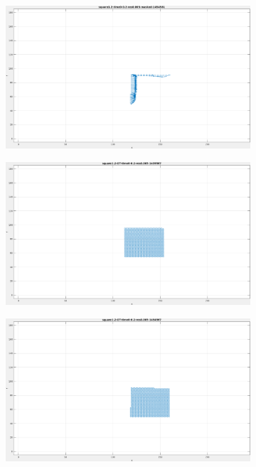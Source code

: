 \begin{figure}[tb]
\begin{subfigure}{.45\textwidth}
  \caption{}
\end{subfigure}
\begin{subfigure}{.45\textwidth}
  \centering
  \includegraphics[height=.6\linewidth]{figs/square12/square12-masked-2.png}
  \caption{}
\end{subfigure}
\begin{subfigure}{.45\textwidth}
  \centering
  \includegraphics[height=.6\linewidth]{figs/square12/square12-GT-1.png}
  \caption{}
\end{subfigure}
\begin{subfigure}{.45\textwidth}
  \centering
  \includegraphics[height=.6\linewidth]{figs/square12/square12-GT-2.png}

\end{subfigure}
\end{figure}
